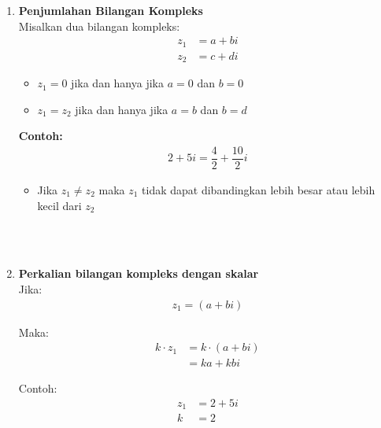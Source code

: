 \documentclass{article}
\begin{document}
\begin{enumerate}
    \item   \textbf{Penjumlahan Bilangan Kompleks}\\

          Misalkan dua bilangan kompleks:
          \begin{align}
              z_1 & = a + bi
              \nonumber      \\
              z_2 & = c + di
              \nonumber
          \end{align}

          \begin{itemize}
              \item $z_1 = 0$ jika dan hanya jika $a = 0$ dan $b = 0$
              \item $z_1 = z_2$ jika dan hanya jika $a = b$ dan $b = d$
          \end{itemize}

          \textbf{Contoh:}
          \begin{align}
              2 + 5i = \dfrac{4}{2} + \dfrac{10}{2}i \nonumber
          \end{align}
          \begin{itemize}
              \item Jika $z_1 \neq z_2$ maka $z_1$ tidak dapat dibandingkan lebih besar atau lebih kecil dari $z_2$
          \end{itemize}
          \leavevmode
          \\\\

    \item   \textbf{Perkalian bilangan kompleks dengan skalar}\\

          Jika:
          \begin{align}
              z_1 = (a + bi) \nonumber
          \end{align}

          Maka:
          \begin{align}
              k \cdot z_1 & = k \cdot (a + bi)
              \nonumber                          \\
                          & = ka + kbi \nonumber
          \end{align}

          Contoh:
          \begin{align}
              z_1 & = 2 + 5i
              \nonumber      \\
              k   & = 2
              \nonumber
          \end{align}


\end{enumerate}
\end{document}

